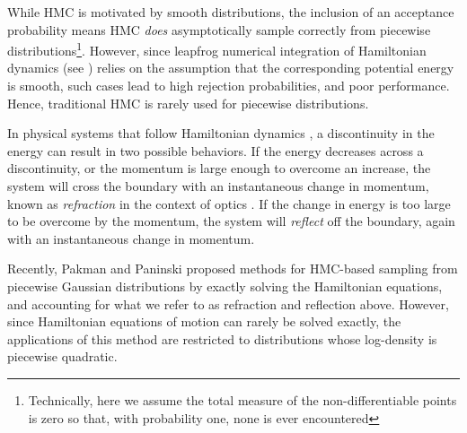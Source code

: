 \documentclass{article} %
\begin{document}

While HMC is motivated by smooth distributions, the inclusion of an acceptance probability means HMC \emph{does} asymptotically sample correctly from piecewise distributions\footnote{Technically, here we assume the total measure of the non-differentiable points is zero so that, with probability one, none is ever encountered}.  However, since leapfrog numerical integration of Hamiltonian dynamics (see \cite{neal2011mcmc}) relies on the assumption that the corresponding potential energy is smooth, such cases lead to high rejection probabilities, and poor performance.  Hence, traditional HMC is rarely used for piecewise distributions.

In physical systems that follow Hamiltonian dynamics \cite{greenwood1988principles}, a discontinuity in the energy can result in two possible behaviors.  If the energy decreases across a discontinuity, or the momentum is large enough to overcome an increase, the system will cross the boundary with an instantaneous change in momentum, known as \emph{refraction} in the context of optics \cite{buchdahl1993introduction}.  If the change in energy is too large to be overcome by the momentum, the system will \emph{reflect} off the boundary, again with an instantaneous change in momentum.



Recently, Pakman and Paninski \cite{pakman2014exact, pakman2013auxiliary} proposed methods for HMC-based sampling from piecewise Gaussian distributions by exactly solving the Hamiltonian equations, and accounting for what we refer to as refraction and reflection above.  However, since Hamiltonian equations of motion can rarely be solved exactly, the applications of this method are restricted to distributions whose log-density is piecewise quadratic.
\end{document}
